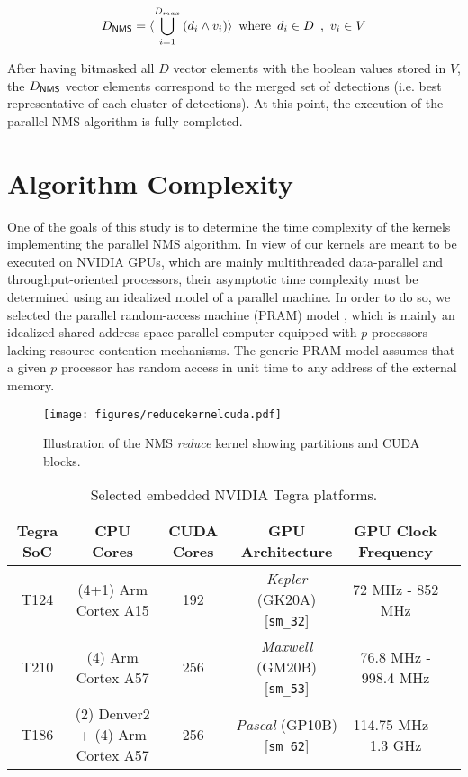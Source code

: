 \begin{equation}
\label{eq:dvectornms} 
D_{\tiny\textsf{NMS}\normalsize} = \langle \bigcup_{i=1}^{D_{max}} \left(d_i \wedge v_i \right) \rangle \enspace \textrm{where} \enspace 
d_i \in D \enspace \textrm{,} \enspace v_i \in V
\end{equation}

After having bitmasked all $D$ vector elements with the boolean values stored in $V$, the $D_{\tiny\textsf{NMS}\normalsize}$ vector 
elements correspond to the merged set of detections (i.e. best representative of each cluster of detections). At this point, the 
execution of the parallel NMS algorithm is fully completed.

\section{Algorithm Complexity}
\label{sec:complexity}

One of the goals of this study is to determine the time complexity of the kernels implementing the parallel NMS algorithm. In view 
of our kernels are meant to be executed on NVIDIA GPUs, which are mainly multithreaded data-parallel and throughput-oriented processors, 
their asymptotic time complexity must be determined using an idealized model of a parallel machine. In order to do so, we selected the 
parallel random-access machine (PRAM) 
model \cite{karp1988survey} \cite{fortune1978parallelism}, which is mainly an idealized shared address space 
parallel computer equipped with $p$ processors lacking resource contention mechanisms. The generic PRAM model assumes 
that a given $p$ processor has random access in unit time to any address of the external memory.

\begin{figure*}[!t]
\centering
\texttt{[image: figures/reducekernelcuda.pdf]}
\caption{\label{fig:reducekernelcuda} Illustration of the NMS \emph{reduce} kernel showing partitions and CUDA blocks.}
\end{figure*}


 \begin{table*}
  \renewcommand{\arraystretch}{1.3}
  \caption{Selected embedded NVIDIA Tegra platforms.}
  \centering
  \footnotesize
  \begin{tabular}{| c | c | c | c | c | c |}
  \hline
  \textbf{Tegra SoC} & \textbf{CPU Cores} & \textbf{CUDA Cores} & \textbf{GPU Architecture} & \textbf{GPU Clock Frequency} \\
  \hline
  T124 & (4+1) Arm Cortex A15 & 192 & \emph{Kepler} (GK20A) [\texttt{sm\_32}] & 72 MHz - 852 MHz \\
  T210 & (4) Arm Cortex A57 & 256 & \emph{Maxwell} (GM20B) [\texttt{sm\_53}] & 76.8 MHz - 998.4 MHz \\
  T186 & (2) Denver2 + (4) Arm Cortex A57 & 256 & \emph{Pascal} (GP10B) [\texttt{sm\_62}] & 114.75 MHz - 1.3 GHz \\
  \hline
  \end{tabular}
  \normalsize
  \label{tab:jetsonplatforms}
 \end{table*}


